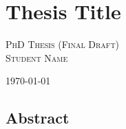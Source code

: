 \chapter*{Thesis Title}

\begin{center}
\Large{
\textsc{PhD Thesis (Final Draft) \\ Student Name \\ }
}

\today\ \currenttime
\end{center}

\clearpage

\section*{Abstract}




\listoftodos
\clearpage